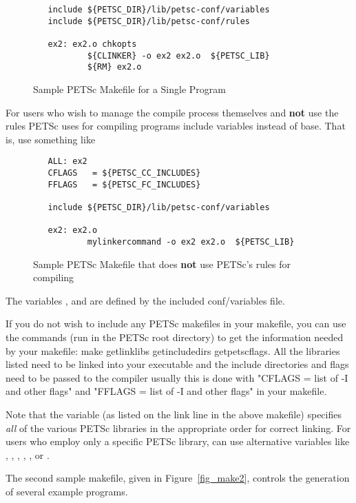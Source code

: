 {{\begin{figure}[H]
{\begin{verbatim}
   include ${PETSC_DIR}/lib/petsc-conf/variables
   include ${PETSC_DIR}/lib/petsc-conf/rules

   ex2: ex2.o chkopts
           ${CLINKER} -o ex2 ex2.o  ${PETSC_LIB}
           ${RM} ex2.o
\end{verbatim}
}
\caption{Sample PETSc Makefile for a Single Program}
\label{fig_make1}
\end{figure}

For users who wish to manage the compile process themselves
and {\bf not} use the rules PETSc uses for compiling programs
include variables instead of base. That is, use something like

\begin{figure}[H]
{\small
\begin{verbatim}
   ALL: ex2
   CFLAGS   = ${PETSC_CC_INCLUDES}
   FFLAGS   = ${PETSC_FC_INCLUDES}

   include ${PETSC_DIR}/lib/petsc-conf/variables

   ex2: ex2.o
           mylinkercommand -o ex2 ex2.o  ${PETSC_LIB}
\end{verbatim}
}
\caption{Sample PETSc Makefile that does {\bf not} use PETSc's rules for compiling}
\label{fig_make1var}
\end{figure}
The variables , 
and  are defined by the included conf/variables file.

If you do not wish to include any PETSc makefiles in your makefile,
you can use the commands (run in the PETSc root directory) to get the information
needed by your makefile: make getlinklibs getincludedirs getpetscflags.
All the libraries listed need to be linked into your executable and the
include directories and flags need to be passed to the compiler usually
this is done with "CFLAGS = list of -I and other flags" and
"FFLAGS = list of -I and other flags" in your makefile.



 
Note that the variable  (as listed on the link
line in the above makefile) specifies {\em all} of the various PETSc
libraries in the appropriate order for correct linking.  For users who
employ only a specific PETSc library, can use alternative variables
like  , ,
, ,
,  or
.

The second sample makefile, given in Figure~\ref{fig_make2},
controls the generation of several example programs.

}}
